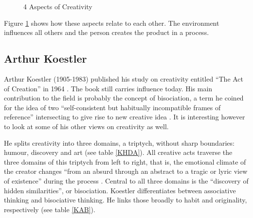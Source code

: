 \begin{figure}[htb] %
  \centering
  \tikzset{every fit/.append style=text badly centered}
\caption[4 Aspects of Creativity]{4 Aspects of Creativity}
\label{fig:4Crea}
\end{figure}

\begin{draft}
  Figure \ref{fig:4Crea} shows how these aspects relate to each other. The environment influences all others and the person creates the product in a process.
\end{draft}

\subsection{Arthur Koestler}

Arthur Koestler (1905-1983) published his study on creativity entitled ``The Act of Creation'' in 1964 \citep{Koestler1964}. The book still carries influence today. His main contribution to the field is probably the concept of \gls{bisociation}, a term he coined for the idea of two ``self-consistent but habitually incompatible frames of reference'' intersecting to give rise to new creative idea \citep[p.35]{Koestler1964}. It is interesting however to look at some of his other views on creativity as well.

He splits creativity into three domains, a triptych, without sharp boundaries: humour, discovery and art (see table \ref{KHDA}). All creative acts traverse the three domains of this triptych from left to right, that is, the emotional climate of the creator changes ``from an absurd through an abstract to a tragic or lyric view of existence'' during the process \citep[p.27]{Koestler1964}. Central to all three domains is the ``discovery of hidden similarities'', or bisociation. Koestler differentiates between associative thinking and bisociative thinking. He links those broadly to habit and originality, respectively (see table \ref{KAB}).

